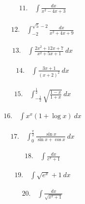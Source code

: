\documentclass[autodetect-engine,ja=standard, 10.5pt, a4paper, titlepage]{bxjsarticle}
\numberwithin{equation}{section} %
\begin{document}
  \begin{fleqn}[0pt]
    \begin{align*}
      11.\quad \int \frac{dx}{x^2 - 4x + 3}
    \end{align*}
  \end{fleqn}
  \begin{fleqn}[0pt]
    \begin{align*}
      12.\quad \int_{-2}^{\sqrt{5}-2} \frac{dx}{x^2 + 4x + 9}
    \end{align*}
  \end{fleqn}
  \begin{fleqn}[0pt]
    \begin{align*}
      13.\quad \int \frac{2x^2 + 12x + 7}{x^2 + 5x + 1} \:dx
    \end{align*}
  \end{fleqn}
  \begin{fleqn}[0pt]
    \begin{align*}
      14.\quad \int \frac{3x + 1}{(x+2)^2} \:dx
    \end{align*}
  \end{fleqn}
  \begin{fleqn}[0pt]
    \begin{align*}
      15.\quad \int_{-\frac{1}{2}}^{\frac{1}{2}} \sqrt{\frac{1-x}{1+x}} \:dx
    \end{align*}
  \end{fleqn}
  \begin{fleqn}[0pt]
    \begin{align*}
      16.\quad \int x^x(1+\log x) \:dx
    \end{align*}
  \end{fleqn}
  \begin{fleqn}[0pt]
    \begin{align*}
      17.\quad \int_{0}^{\frac{\pi}{2}} \frac{\sin x}{\sin x + \cos x} \:dx
    \end{align*}
  \end{fleqn}
  \begin{fleqn}[0pt]
    \begin{align*}
      18.\quad \int \frac{dx}{e^x + 1}
    \end{align*}
  \end{fleqn}
  \begin{fleqn}[0pt]
    \begin{align*}
      19.\quad \int \sqrt{e^x} + 1 \:dx
    \end{align*}
  \end{fleqn}
  \begin{fleqn}[0pt]
    \begin{align*}
      20.\quad \int \frac{dx}{\sqrt{x^2 + 1}}
    \end{align*}
  \end{fleqn}
\end{document}

